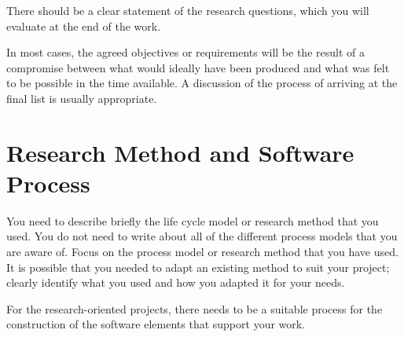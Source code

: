 There should be a clear statement of the research questions, which you will evaluate at the end of the work. 

In most cases, the agreed objectives or requirements will be the result of a compromise between what would ideally have been produced and what was felt to be possible in the time available. A discussion of the process of arriving at the final list is usually appropriate.

\section{Research Method and Software Process}
You need to describe briefly the life cycle model or research method that you used. You do not need to write about all of the different process models that you are aware of. Focus on the process model or research method that you have used. It is possible that you needed to adapt an existing method to suit your project; clearly identify what you used and how you adapted it for your needs.

For the research-oriented projects, there needs to be a suitable process for the construction of the software elements that support your work. 

